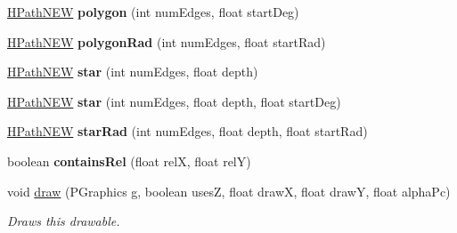 \begin{DoxyCompactItemize}
\item 
\hypertarget{classhype_1_1extended_1_1drawable_1_1_h_path_n_e_w_adecb0a4bb96ecad3d5328eb3f5f01625}{\hyperlink{classhype_1_1extended_1_1drawable_1_1_h_path_n_e_w}{H\-Path\-N\-E\-W} {\bfseries polygon} (int num\-Edges, float start\-Deg)}\label{classhype_1_1extended_1_1drawable_1_1_h_path_n_e_w_adecb0a4bb96ecad3d5328eb3f5f01625}

\item 
\hypertarget{classhype_1_1extended_1_1drawable_1_1_h_path_n_e_w_af6b003e5c3d75c06ff5c7cf39c491d45}{\hyperlink{classhype_1_1extended_1_1drawable_1_1_h_path_n_e_w}{H\-Path\-N\-E\-W} {\bfseries polygon\-Rad} (int num\-Edges, float start\-Rad)}\label{classhype_1_1extended_1_1drawable_1_1_h_path_n_e_w_af6b003e5c3d75c06ff5c7cf39c491d45}

\item 
\hypertarget{classhype_1_1extended_1_1drawable_1_1_h_path_n_e_w_a98e3fe595d9d0ed3abcce7e9dcbd6de7}{\hyperlink{classhype_1_1extended_1_1drawable_1_1_h_path_n_e_w}{H\-Path\-N\-E\-W} {\bfseries star} (int num\-Edges, float depth)}\label{classhype_1_1extended_1_1drawable_1_1_h_path_n_e_w_a98e3fe595d9d0ed3abcce7e9dcbd6de7}

\item 
\hypertarget{classhype_1_1extended_1_1drawable_1_1_h_path_n_e_w_ae0ef240237ab5ff651227aa0ecc49872}{\hyperlink{classhype_1_1extended_1_1drawable_1_1_h_path_n_e_w}{H\-Path\-N\-E\-W} {\bfseries star} (int num\-Edges, float depth, float start\-Deg)}\label{classhype_1_1extended_1_1drawable_1_1_h_path_n_e_w_ae0ef240237ab5ff651227aa0ecc49872}

\item 
\hypertarget{classhype_1_1extended_1_1drawable_1_1_h_path_n_e_w_a420cb62e91cd62e56ab01d6da48fec96}{\hyperlink{classhype_1_1extended_1_1drawable_1_1_h_path_n_e_w}{H\-Path\-N\-E\-W} {\bfseries star\-Rad} (int num\-Edges, float depth, float start\-Rad)}\label{classhype_1_1extended_1_1drawable_1_1_h_path_n_e_w_a420cb62e91cd62e56ab01d6da48fec96}

\item 
\hypertarget{classhype_1_1extended_1_1drawable_1_1_h_path_n_e_w_a252d7a32d5d743a3c3c7d1618384a9dc}{boolean {\bfseries contains\-Rel} (float rel\-X, float rel\-Y)}\label{classhype_1_1extended_1_1drawable_1_1_h_path_n_e_w_a252d7a32d5d743a3c3c7d1618384a9dc}

\item 
void \hyperlink{classhype_1_1extended_1_1drawable_1_1_h_path_n_e_w_affff7eae92716e0b95a70eafa9b708e8}{draw} (P\-Graphics g, boolean uses\-Z, float draw\-X, float draw\-Y, float alpha\-Pc)
\begin{DoxyCompactList}\small\item\em Draws this drawable. \end{DoxyCompactList}\end{DoxyCompactItemize}
